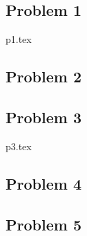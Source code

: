 \documentclass[a4paper]{article}
\begin{document}
    \subsection{Problem 1}
    {p1.tex}

    \subsection{Problem 2}

    \subsection{Problem 3}
    {p3.tex}

    \subsection{Problem 4}

    \subsection{Problem 5}
\end{document}
